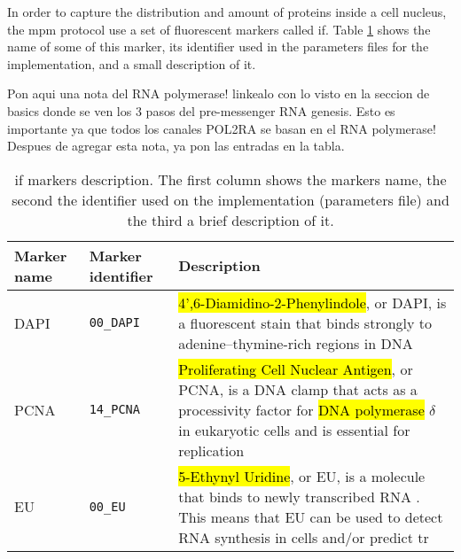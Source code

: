 
\glsresetall

In order to capture the distribution and amount of proteins inside a cell nucleus, the \gls{mpm} protocol use a set of fluorescent markers called \gls{if}. Table \ref{table:apendix:if_markers} shows the name of some of this marker, its identifier used in the parameters files for the implementation, and a small description of it.

Pon aqui una nota del RNA polymerase! linkealo con lo visto en la seccion de basics donde se ven los 3 pasos del pre-messenger RNA genesis. Esto es importante ya que todos los canales POL2RA se basan en el RNA polymerase! Despues de agregar esta nota, ya pon las entradas en la tabla.

\setlength{\mylinewidth}{\linewidth-7pt}%
\setlength{\mylengtha}{0.12\mylinewidth-2\arraycolsep}%
\setlength{\mylengthb}{0.15\mylinewidth-2\arraycolsep}%
\setlength{\mylengthc}{0.73\mylinewidth-2\arraycolsep}%

\begin{table}[!ht]
  \centering
  \begin{tabular}{>{\centering\arraybackslash}m{\mylengtha}|>{\centering\arraybackslash}m{\mylengthb}|m{\mylengthc}} %
    \hline
    Marker name & Marker identifier & Description \\
    \hline
    DAPI & \texttt{00\_DAPI} & \hl{4',6-Diamidino-2-Phenylindole}, or DAPI, is a fluorescent stain that binds strongly to adenine–thymine-rich regions in DNA \cite{kapuscinski1995dapi} \\
    \hline
    PCNA & \texttt{14\_PCNA} & \hl{Proliferating Cell Nuclear Antigen}, or PCNA, is a DNA clamp that acts as a processivity factor for \hl{DNA polymerase} $\delta$\footnotemark in eukaryotic cells and is essential for replication \cite{kisielewska2005gfp} \\
    \hline
    EU & \texttt{00\_EU} & \hl{5-Ethynyl Uridine}, or EU, is a molecule that binds to newly transcribed RNA \cite{jao2008exploring}. This means that EU can be used to detect RNA synthesis in cells and/or predict \gls{tr} \\
    \hline
  \end{tabular}
  \caption{\Acrlong{if} markers description. The first column shows the markers name, the second the identifier used on the implementation (parameters file) and the third a brief description of it.}
  \label{table:apendix:if_markers}
\end{table}
